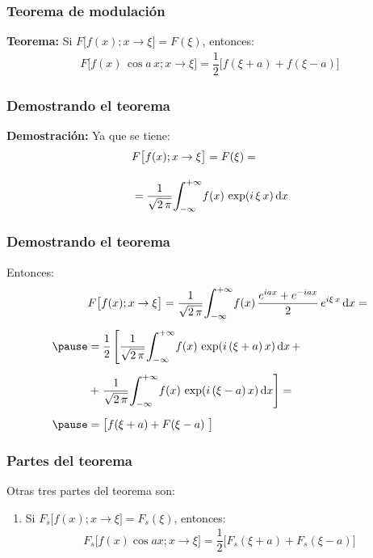 \begin{frame}
\frametitle{Teorema de modulación}
\textbf{Teorema:} Si $F \big[ f (x); x \to \xi \big] = F (\xi)$, entonces:
\pause
\begin{align*}
F \big[ f (x) \, \cos a \, x; x \to \xi \big] = \dfrac{1}{2} \big[f (\xi + a) + f (\xi - a) \big]
\end{align*}
\end{frame}
\begin{frame}
\frametitle{Demostrando el teorema}
\textbf{Demostración:}
Ya que se tiene:
\pause
\begin{align*}
&F \big[f (x); x \to \xi \big] = F (\xi) = \\[1em]
&= \dfrac{1}{\sqrt{2 \, \pi}} \scaleint{6ex}_{\bs -\infty}^{+\infty} f (x) \, \exp(i \, \xi \, x) \dd{x}
\end{align*}
\end{frame}
\begin{frame}
\frametitle{Demostrando el teorema}
Entonces:
\pause
\begin{eqnarray*}
\begin{aligned}
&F \big[ f (x); x \to \xi \big] = \dfrac{1}{\sqrt{2 \, \pi}} \scaleint{6ex}_{\bs -\infty}^{+\infty} f (x) \, \dfrac{e^{i a x} + e^{-i a x}}{2} \, e^{i \xi \, x} \dd{x} = \\[0.5em] \pause
&= \dfrac{1}{2} \left[ \dfrac{1}{\sqrt{2 \, \pi}} \scaleint{6ex}_{\bs -\infty}^{+\infty} f (x) \, \exp(i \, (\xi + a) \, x)  \dd{x} + \right. \\[0.5em]
&+ \left. \dfrac{1}{\sqrt{2 \, \pi}} \scaleint{6ex}_{\bs -\infty}^{+\infty} f (x) \, \exp(i \, (\xi - a) \, x)  \dd{x} \right] = \\[0.5em] \pause
&= \big[ f (\xi + a) + F (\xi - a) \big]
\end{aligned}
\end{eqnarray*}
\end{frame}
\begin{frame}
\frametitle{Partes del teorema}
Otras tres partes del teorema son:
\pause
{}
\begin{enumerate}[<+->]
\item Si $F_{s} \big[ f (x); x \to \xi \big] = F_{s} (\xi)$, entonces:
\pause
\begin{align*}
F_{s} \big[ f (x) \cos a x; x \to \xi \big] = \dfrac{1}{2} \big[ F_{s} (\xi {+}  a) {+} F_{s} (\xi {-} a) \big]
\end{align*}
\seti
\end{enumerate}
\end{frame}

